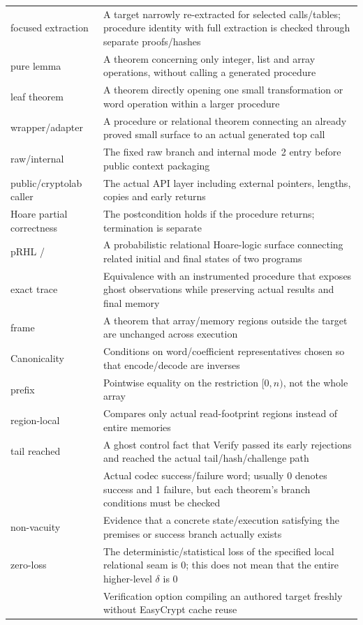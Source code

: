 \begin{longtable}{L{37mm} L{110mm}}
focused extraction & A target narrowly re-extracted for selected calls/tables;
procedure identity with full extraction is checked through separate proofs/hashes \\
pure lemma & A theorem concerning only integer, list and array operations,
without calling a generated procedure \\
leaf theorem & A theorem directly opening one small transformation or word
operation within a larger procedure \\
wrapper/adapter & A procedure or relational theorem connecting an already
proved small surface to an actual generated top call \\
raw/internal & The fixed raw branch and internal mode~2 entry before public
context packaging \\
public/cryptolab caller & The actual API layer including external pointers,
lengths, copies and early returns \\
Hoare partial correctness & The postcondition holds if the procedure returns;
termination is separate \\
pRHL /  & A probabilistic relational Hoare-logic surface
connecting related initial and final states of two programs \\
exact trace & Equivalence with an instrumented procedure that exposes ghost
observations while preserving actual results and final memory \\
frame & A theorem that array/memory regions outside the target are unchanged
across execution \\
Canonicality & Conditions on word/coefficient representatives chosen so that
encode/decode are inverses \\
prefix & Pointwise equality on the restriction \([0,n)\), not the whole array \\
region-local & Compares only actual read-footprint regions instead of entire memories \\
tail reached & A ghost control fact that Verify passed its early rejections
and reached the actual tail/hash/challenge path \\
 & Actual codec success/failure word; usually 0 denotes success
and 1 failure, but each theorem's branch conditions must be checked \\
non-vacuity & Evidence that a concrete state/execution satisfying the premises
or success branch actually exists \\
zero-loss & The deterministic/statistical loss of the specified local relational
seam is 0; this does not mean that the entire higher-level \(\delta\) is 0 \\
 & Verification option compiling an authored target freshly
without EasyCrypt cache reuse \\
\bottomrule
\end{longtable}

